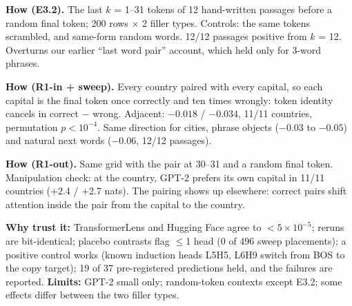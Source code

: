 \documentclass[10pt]{article}
\begin{document}
\vspace{3pt}
\begin{minipage}[t]{0.325\linewidth}\footnotesize
\textbf{ How (E3.2).} The last $k$ = 1--31 tokens of 12 hand-written passages before a random final token; 200 rows $\times$ 2 filler types. Controls: the same tokens scrambled, and same-form random words. 12/12 passages positive from $k$ = 12. Overturns our earlier ``last word pair'' account, which held only for 3-word phrases.
\end{minipage}\hfill
\begin{minipage}[t]{0.325\linewidth}\footnotesize
\textbf{ How (R1-in + sweep).} Every country paired with every capital, so each capital is the final token once correctly and ten times wrongly: token identity cancels in correct $-$ wrong. Adjacent: $-0.018$ / $-0.034$, 11/11 countries, permutation $p < 10^{-4}$. Same direction for cities, phrase objects ($-0.03$ to $-0.05$) and natural next words ($-0.06$, 12/12 passages).
\end{minipage}\hfill
\begin{minipage}[t]{0.325\linewidth}\footnotesize
\textbf{ How (R1-out).} Same grid with the pair at 30--31 and a random final token. Manipulation check: at the country, GPT-2 prefers its own capital in 11/11 countries (+2.4 / +2.7 nats). The pairing shows up elsewhere: correct pairs shift attention inside the pair from the capital to the country.
\end{minipage}

\vspace{4pt}
{\footnotesize\textbf{Why trust it:} TransformerLens and Hugging Face agree to $<5\times10^{-5}$; reruns are bit-identical; placebo contrasts flag $\le$1 head (0 of 496 sweep placements); a positive control works (known induction heads L5H5, L6H9 switch from BOS to the copy target); 19 of 37 pre-registered predictions held, and the failures are reported. \textbf{Limits:} GPT-2 small only; random-token contexts except E3.2; some effects differ between the two filler types.}
\end{document}
